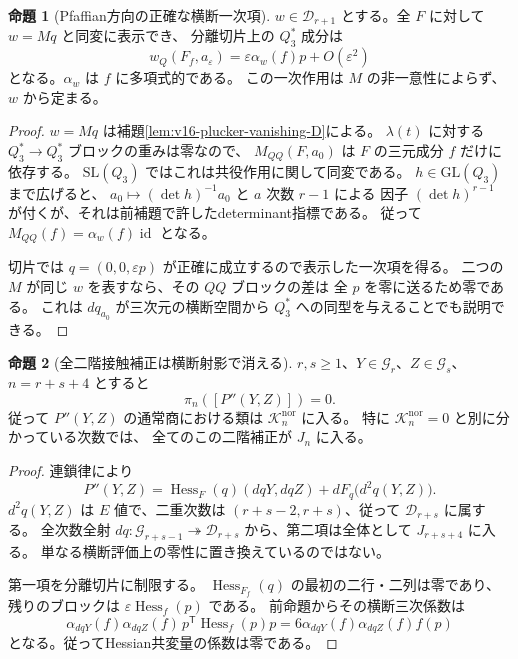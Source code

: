 \documentclass[a4paper,11pt]{ltjsarticle}
\theoremstyle{definition}
\newtheorem{theorem}{命題}[section]
\newtheorem{proposition}[theorem]{命題}
\begin{document}
\begin{proposition}[Pfaffian方向の正確な横断一次項]
\label{prop:v17-scalar-normal-pfaffian-action}
$w\in\mathcal D_{r+1}$ とする。全 $F$ に対して
$w=Mq$ と同変に表示でき、
分離切片上の $Q_3^*$ 成分は
\begin{equation}\label{eq:v17-scalar-normal-pfaffian-action}
 w_Q(F_f,a_\varepsilon)
  =\varepsilon\alpha_w(f)p+O(\varepsilon^2)
\end{equation}
となる。$\alpha_w$ は $f$ に多項式的である。
この一次作用は $M$ の非一意性によらず、$w$ から定まる。
\end{proposition}

\begin{proof}
$w=Mq$ は補題\ref{lem:v16-plucker-vanishing-D}による。
$\lambda(t)$ に対する $Q_3^*\to Q_3^*$ ブロックの重みは零なので、
$M_{QQ}(F,a_0)$ は $F$ の三元成分 $f$ だけに依存する。
$\mathrm{SL}(Q_3)$ ではこれは共役作用に関して同変である。
$h\in\mathrm{GL}(Q_3)$ まで広げると、
$a_0\mapsto(\det h)^{-1}a_0$ と $a$ 次数 $r-1$ による
因子 $(\det h)^{r-1}$ が付くが、それは前補題で許したdeterminant指標である。
従って $M_{QQ}(f)=\alpha_w(f)\operatorname{id}$ となる。

切片では $q=(0,0,\varepsilon p)$ が正確に成立するので表示した一次項を得る。
二つの $M$ が同じ $w$ を表すなら、その $QQ$ ブロックの差は
全 $p$ を零に送るため零である。
これは $dq_{a_0}$ が三次元の横断空間から $Q_3^*$ への同型を与えることでも説明できる。
\end{proof}

\begin{theorem}[全二階接触補正は横断射影で消える]
\label{thm:v17-quadratic-actions-normal-zero}
$r,s\ge1$、$Y\in\mathcal G_r$、$Z\in\mathcal G_s$、$n=r+s+4$ とすると
\begin{equation}\label{eq:v17-quadratic-actions-normal-zero}
 \pi_n([P''(Y,Z)])=0.
\end{equation}
従って $P''(Y,Z)$ の通常商における類は
$\mathcal K_n^{\mathrm{nor}}$ に入る。
特に $\mathcal K_n^{\mathrm{nor}}=0$ と別に分かっている次数では、
全てのこの二階補正が $J_n$ に入る。
\end{theorem}

\begin{proof}
連鎖律により
\[
 P''(Y,Z)=\operatorname{Hess}_F(q)(dqY,dqZ)
              +dF_q\bigl(d^2q(Y,Z)\bigr).
\]
$d^2q(Y,Z)$ は $E$ 値で、二重次数は
$(r+s-2,r+s)$、従って $\mathcal D_{r+s}$ に属する。
全次数全射 $dq:\mathcal G_{r+s-1}\twoheadrightarrow\mathcal D_{r+s}$
から、第二項は全体として $J_{r+s+4}$ に入る。
単なる横断評価上の零性に置き換えているのではない。

第一項を分離切片に制限する。
$\operatorname{Hess}_{F_f}(q)$ の最初の二行・二列は零であり、
残りのブロックは $\varepsilon\operatorname{Hess}_f(p)$ である。
前命題からその横断三次係数は
\[
 \alpha_{dqY}(f)\alpha_{dqZ}(f)\,
       p^{\mathsf T}\operatorname{Hess}_f(p)p
 =6\alpha_{dqY}(f)\alpha_{dqZ}(f)f(p)
\]
となる。従ってHessian共変量の係数は零である。
\end{proof}
\end{document}
